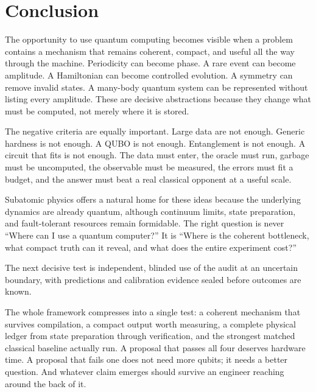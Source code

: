 \section{Conclusion}

The opportunity to use quantum computing becomes visible when a problem contains a mechanism that remains coherent, compact, and useful all the way through the machine. Periodicity can become phase. A rare event can become amplitude. A Hamiltonian can become controlled evolution. A symmetry can remove invalid states. A many-body quantum system can be represented without listing every amplitude. These are decisive abstractions because they change what must be computed, not merely where it is stored.

The negative criteria are equally important. Large data are not enough. Generic hardness is not enough. A QUBO is not enough. Entanglement is not enough. A circuit that fits is not enough. The data must enter, the oracle must run, garbage must be uncomputed, the observable must be measured, the errors must fit a budget, and the answer must beat a real classical opponent at a useful scale.

Subatomic physics offers a natural home for these ideas because the underlying dynamics are already quantum, although continuum limits, state preparation, and fault-tolerant resources remain formidable. The right question is never ``Where can I use a quantum computer?'' It is ``Where is the coherent bottleneck, what compact truth can it reveal, and what does the entire experiment cost?''

The next decisive test is independent, blinded use of the audit at an uncertain boundary, with predictions and calibration evidence sealed before outcomes are known.

The whole framework compresses into a single test: a coherent mechanism that survives compilation, a compact output worth measuring, a complete physical ledger from state preparation through verification, and the strongest matched classical baseline actually run. A proposal that passes all four deserves hardware time. A proposal that fails one does not need more qubits; it needs a better question. And whatever claim emerges should survive an engineer reaching around the back of it.
